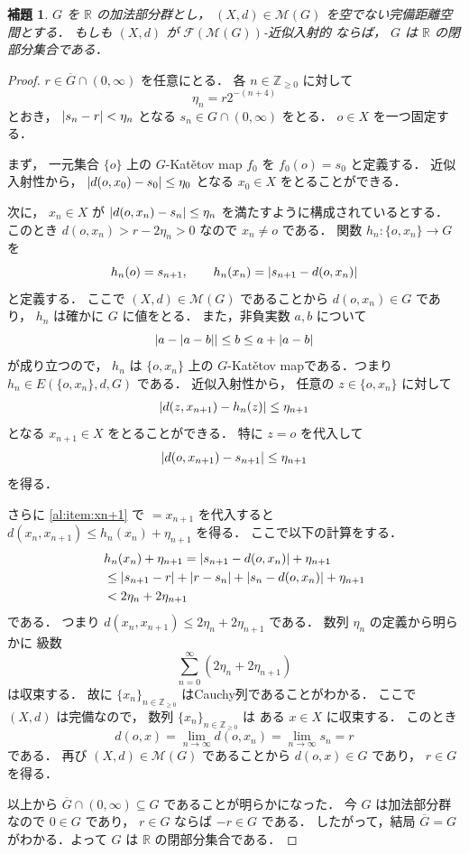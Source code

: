 \documentclass[leqno, 12pt]{jsarticle}
\newtheorem{lem}[thm]{補題}
\newcommand{\zz}{\mathbb{Z}}
\newcommand{\yozz}[1]{\zz_{\ge #1}}
\newcommand{\rr}{\mathbb{R}}
\DeclarePairedDelimiter{\abs}{\lvert}{\rvert}
\newcommand{\Met}[1]{\mathscr{M}(#1)}
\newcommand{\FinitePart}[1]{\mathscr{F}(#1)}
\newcommand{\FinMet}[1]{\FinitePart{\Met{#1}}}
\newcommand{\Espace}[3]{E(#1,#2,#3)}
\begin{document}
\begin{lem}\label{lem:katetov:complete-approx-group-closed}
$G$
を
$\rr$
の加法部分群とし，
$(X,d)\in\Met{G}$
を空でない完備距離空間とする．
もしも
$(X,d)$
が
$\FinMet{G}$-近似入射的
ならば，
$G$
は
$\rr$
の閉部分集合である．
\end{lem}
\begin{proof}
$r\in\overline{G}\cap(0,\infty)$
を任意にとる．
各
$n\in\yozz{0}$
に対して
\[
\eta_{n}=r2^{-(n+4)}
\]
とおき，
$\abs{s_n-r}<\eta_{n}$
となる
$s_{n}\in G\cap(0,\infty)$
をとる．
$o\in X$
を一つ固定する．


まず，
一元集合
$\{o\}$
上の
$G$-Kat\v{e}tov map
$f_0$
を
$f_{0}(o)=s_{0}$
と定義する．
近似入射性から，
$\abs{d(o,x_{0})-s_{0}}\le\eta_{0}$
となる
$x_{0}\in X$
をとることができる．


次に，
$x_n\in X$
が
$\abs{d(o, x_{n})-s_{n}}\le\eta_{n}$
を満たすように構成されているとする．
このとき
$d(o,x_n)
>r-2\eta_n
>0$
なので
$x_n\neq o$
である．
関数
$h_{n}\colon\{o, x_{n}\}\to G$
を
\[
h_n(o)=s_{n+1},
\qquad
h_n(x_n)=\abs{s_{n+1}-d(o,x_n)}
\]
と定義する．
ここで
$(X,d)\in\Met{G}$
であることから
$d(o,x_n)\in G$
であり，
$h_n$
は確かに
$G$
に値をとる．
また，非負実数
$a,b$
について
\[
\abs{a-\abs{a-b}}\le b\le a+\abs{a-b}
\]
が成り立つので，
$h_n$
は
$\{o,x_n\}$
上の
$G$-Kat\v{e}tov mapである．つまり
$h_{n}\in\Espace{\{o,x_n\}}{d}{G}$
である．
近似入射性から，
任意の
$z\in\{o, x_{n}\}$
に対して
\begin{align}\label{al:item:xn+1}
\abs{d(z, x_{n+1})-h_{n}(z)}\le\eta_{n+1}
\end{align}
となる
$x_{n+1}\in X$
をとることができる．
特に
$z=o$
を代入して
\[
\abs{d(o, x_{n+1})-s_{n+1}}\le\eta_{n+1}
\]
を得る．


さらに
\eqref{al:item:xn+1}
で
$=x_{n+1}$
を代入すると
$d(x_n,x_{n+1})\le h_n(x_n)+\eta_{n+1}$
を得る．
ここで以下の計算をする．
\begin{align*}
&h_n(x_n)+\eta_{n+1}=\abs{s_{n+1}-d(o,x_n)}+\eta_{n+1}\\
&\le \abs{s_{n+1}-r}
 +\abs{r-s_n}
 +\abs{s_n-d(o,x_n)}
 +\eta_{n+1}\\
&<2\eta_n+2\eta_{n+1}
\end{align*}
である．
つまり
$d(x_{n}, x_{n+1})\le 2\eta_{n}+2\eta_{n+1}$
である．
数列
$\eta_{n}$
の定義から明らかに
級数
\[
\sum_{n=0}^{\infty}(2\eta_n+2\eta_{n+1})
\]
は収束する．
故に
$\{x_{n}\}_{n\in\yozz{0}}$
はCauchy列であることがわかる．
ここで
$(X, d)$
は完備なので，
数列
$\{x_{n}\}_{n\in \yozz{0}}$
は
ある
$x\in X$
に収束する．
このとき
\[
d(o,x)
=\lim_{n\to\infty}d(o,x_n)
=\lim_{n\to\infty}s_n
=r
\]
である．
再び
$(X,d)\in\Met{G}$
であることから
$d(o,x)\in G$
であり，
$r\in G$
を得る．


以上から
$\overline{G}\cap(0,\infty)\subseteq G$
であることが明らかになった．
今
$G$
は加法部分群なので
$0\in G$
であり，
$r\in G$
ならば
$-r\in G$
である．
したがって，結局
$\overline{G}=G$
がわかる．よって
$G$
は
$\rr$
の閉部分集合である．
\end{proof}
\end{document}
